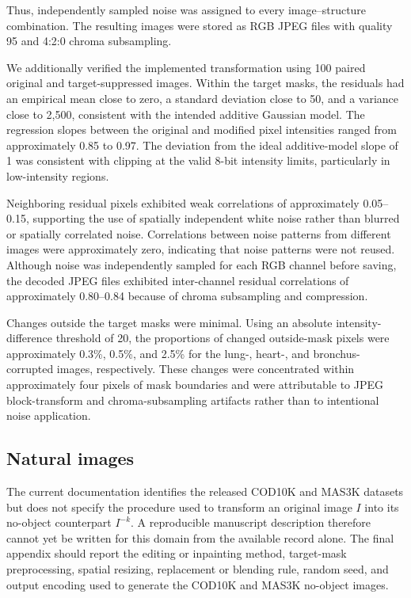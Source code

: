 Thus, independently sampled noise was assigned to every image--structure combination. The resulting images were stored as RGB JPEG files with quality 95 and 4:2:0 chroma subsampling.

We additionally verified the implemented transformation using 100 paired original and target-suppressed images. Within the target masks, the residuals had an empirical mean close to zero, a standard deviation close to 50, and a variance close to 2,500, consistent with the intended additive Gaussian model. The regression slopes between the original and modified pixel intensities ranged from approximately 0.85 to 0.97. The deviation from the ideal additive-model slope of 1 was consistent with clipping at the valid 8-bit intensity limits, particularly in low-intensity regions.

Neighboring residual pixels exhibited weak correlations of approximately 0.05--0.15, supporting the use of spatially independent white noise rather than blurred or spatially correlated noise. Correlations between noise patterns from different images were approximately zero, indicating that noise patterns were not reused. Although noise was independently sampled for each RGB channel before saving, the decoded JPEG files exhibited inter-channel residual correlations of approximately 0.80--0.84 because of chroma subsampling and compression.

Changes outside the target masks were minimal. Using an absolute intensity-difference threshold of 20, the proportions of changed outside-mask pixels were approximately 0.3\%, 0.5\%, and 2.5\% for the lung-, heart-, and bronchus-corrupted images, respectively. These changes were concentrated within approximately four pixels of mask boundaries and were attributable to JPEG block-transform and chroma-subsampling artifacts rather than to intentional noise application.

\subsection{Natural images}

The current documentation identifies the released COD10K and MAS3K datasets but does not specify the procedure used to transform an original image $I$ into its no-object counterpart $I^{-k}$. A reproducible manuscript description therefore cannot yet be written for this domain from the available record alone. The final appendix should report the editing or inpainting method, target-mask preprocessing, spatial resizing, replacement or blending rule, random seed, and output encoding used to generate the COD10K and MAS3K no-object images.

